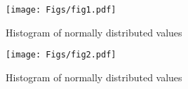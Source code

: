 \documentclass[12pt]{article}
\begin{document}
\begin{figure}[!p]
\centering\texttt{[image: Figs/fig1.pdf]}
\caption{Histogram of normally distributed values}
\label{Fig1}
\end{figure}

\begin{figure}[!p]
    \centering\texttt{[image: Figs/fig2.pdf]}
    \caption{Histogram of normally distributed values}
    \label{Fig1}
    \end{figure}
\end{document}

